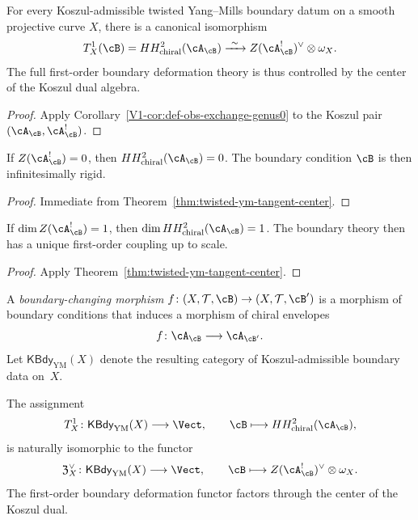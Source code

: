 \begin{theorem}
\label{thm:twisted-ym-tangent-center}
For every Koszul-admissible twisted Yang--Mills boundary datum on a smooth projective
curve $X$, there is a canonical isomorphism
\[
T^1_X(\cB)
= HH^2_{\mathrm{chiral}}(\cA_{\cB})
\xrightarrow{\ \sim\ }
Z(\cA_{\cB}^!)^{\vee} \otimes \omega_X.
\]
The full first-order boundary deformation theory is thus controlled by the center
of the Koszul dual algebra.
\end{theorem}

\begin{proof}
Apply Corollary~\ref{V1-cor:def-obs-exchange-genus0} to the Koszul pair
$(\cA_{\cB}, \cA_{\cB}^!)$.
\end{proof}

\begin{corollary}
\label{cor:twisted-ym-center-rigidity}
If $Z(\cA_{\cB}^!) = 0$, then $HH^2_{\mathrm{chiral}}(\cA_{\cB}) = 0$.
The boundary condition $\cB$ is then infinitesimally rigid.
\end{corollary}

\begin{proof}
Immediate from Theorem~\ref{thm:twisted-ym-tangent-center}.
\end{proof}

\begin{corollary}
\label{cor:twisted-ym-one-parameter}
If $\dim Z(\cA_{\cB}^!) = 1$, then $\dim HH^2_{\mathrm{chiral}}(\cA_{\cB}) = 1$.
The boundary theory then has a unique first-order coupling up to scale.
\end{corollary}

\begin{proof}
Apply Theorem~\ref{thm:twisted-ym-tangent-center}.
\end{proof}

\begin{definition}
\label{def:twisted-ym-boundary-morphism}
A \emph{boundary-changing morphism}
$f \colon (X,\mathcal{T},\cB) \to (X,\mathcal{T},\cB')$
is a morphism of boundary conditions that induces a morphism of chiral envelopes
\[
f \colon \cA_{\cB} \longrightarrow \cA_{\cB'}.
\]
Let $\mathsf{KBdy}_{\mathrm{YM}}(X)$ denote the resulting category of Koszul-admissible
boundary data on~$X$.
\end{definition}

\begin{theorem}
\label{thm:twisted-ym-tangent-factors-through-center}
The assignment
\[
T^1_X \colon \mathsf{KBdy}_{\mathrm{YM}}(X) \longrightarrow \Vect,
\qquad
\cB \longmapsto HH^2_{\mathrm{chiral}}(\cA_{\cB}),
\]
is naturally isomorphic to the functor
\[
\mathfrak{Z}^{\vee}_{X} \colon \mathsf{KBdy}_{\mathrm{YM}}(X) \longrightarrow \Vect,
\qquad
\cB \longmapsto Z(\cA_{\cB}^!)^{\vee} \otimes \omega_X.
\]
The first-order boundary deformation functor factors through the center of
the Koszul dual.
\end{theorem}

